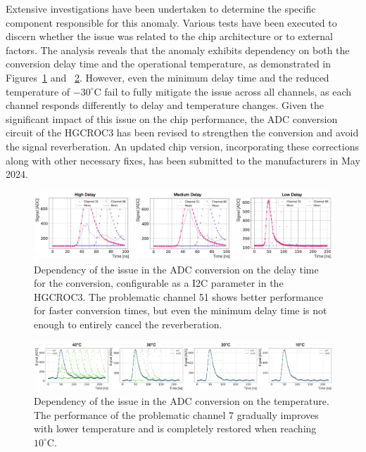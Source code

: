 \bigbreak

Extensive investigations have been undertaken to determine the specific component responsible for this anomaly. 
Various tests have been executed to discern whether the issue was related to the chip architecture or to external factors.
The analysis reveals that the anomaly exhibits dependency on both the conversion delay time and the operational temperature, as demonstrated in Figures~\ref{fig:ADCIssue_Delay} and ~\ref{fig:ADCIssue_Temperature}. 
However, even the minimum delay time and the reduced temperature of $-30^\circ$C fail to fully mitigate the issue across all channels, as each channel responds differently to delay and temperature changes. 
Given the significant impact of this issue on the chip performance, the ADC conversion circuit of the HGCROC3 has been revised to strengthen the conversion and avoid the signal reverberation.
An updated chip version, incorporating these corrections along with other necessary fixes, has been submitted to the manufacturers in May 2024.

\begin{figure}
    \centering
    \includegraphics[width=0.99\linewidth]{Figures/HGCAL/ADCIssue_Delay.pdf}
    \caption{Dependency of the issue in the ADC conversion on the delay time for the conversion, configurable as a I2C parameter in the HGCROC3. The problematic channel 51 shows better performance for faster conversion times, but even the minimum delay time is not enough to entirely cancel the reverberation.}
    \label{fig:ADCIssue_Delay}
\end{figure}

\begin{figure}
    \centering
    \includegraphics[width=0.99\linewidth]{Figures/HGCAL/ADCIssue_Temperature.pdf}
    \caption{Dependency of the issue in the ADC conversion on the temperature. The performance of the problematic channel 7 gradually improves with lower temperature and is completely restored when reaching $10^{\circ}$C.}
    \label{fig:ADCIssue_Temperature}
\end{figure}

